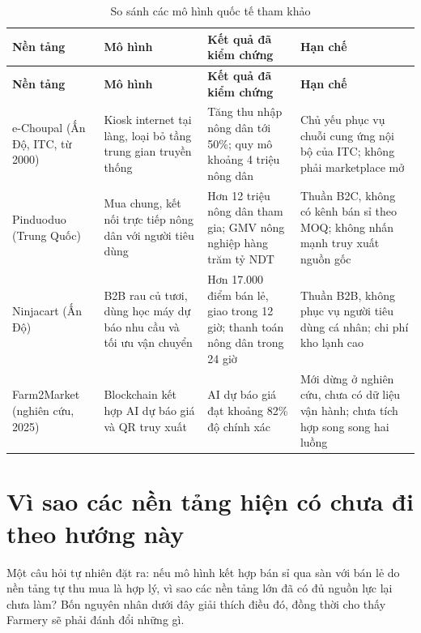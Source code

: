 \begingroup
\tblsetup\tblzebra
\begin{longtable}{L{2.53cm} L{3.13cm} L{4.44cm} L{4.44cm}}
\caption{So sánh các mô hình quốc tế tham khảo}
\label{tab:sosanhquocte} \\
\toprule
{}
\textbf{Nền tảng} & \textbf{Mô hình} & \textbf{Kết quả đã kiểm chứng} & \textbf{Hạn chế} \\
\midrule
\endfirsthead
\toprule
{}
\textbf{Nền tảng} & \textbf{Mô hình} & \textbf{Kết quả đã kiểm chứng} & \textbf{Hạn chế} \\
\midrule
\endhead
\bottomrule
\endfoot
e-Choupal (Ấn Độ, ITC, từ 2000) & Kiosk internet tại làng, loại bỏ tầng trung gian truyền thống & Tăng thu nhập nông dân tới 50\%; quy mô khoảng 4 triệu nông dân \parencite{business_standard_2020_echoupal} & Chủ yếu phục vụ chuỗi cung ứng nội bộ của ITC; không phải marketplace mở \\
Pinduoduo (Trung Quốc) & Mua chung, kết nối trực tiếp nông dân với người tiêu dùng & Hơn 12 triệu nông dân tham gia; GMV nông nghiệp hàng trăm tỷ NDT \parencite{nasdaq_2021_pinduoduo} & Thuần B2C, không có kênh bán sỉ theo MOQ; không nhấn mạnh truy xuất nguồn gốc \\
Ninjacart (Ấn Độ) & B2B rau củ tươi, dùng học máy dự báo nhu cầu và tối ưu vận chuyển & Hơn 17.000 điểm bán lẻ, giao trong 12 giờ; thanh toán nông dân trong 24 giờ \parencite{ninjacart} & Thuần B2B, không phục vụ người tiêu dùng cá nhân; chi phí kho lạnh cao \\
Farm2Market (nghiên cứu, 2025) & Blockchain kết hợp AI dự báo giá và QR truy xuất & AI dự báo giá đạt khoảng 82\% độ chính xác \parencite{farm2market_2025} & Mới dừng ở nghiên cứu, chưa có dữ liệu vận hành; chưa tích hợp song song hai luồng \\
\end{longtable}
\endgroup

\section{Vì sao các nền tảng hiện có chưa đi theo hướng này}
\label{sec:visaochualam}

Một câu hỏi tự nhiên đặt ra: nếu mô hình kết hợp bán sỉ qua sàn với bán lẻ do nền tảng tự thu mua là hợp lý, vì sao các nền tảng lớn đã có đủ nguồn lực lại chưa làm? Bốn nguyên nhân dưới đây giải thích điều đó, đồng thời cho thấy Farmery sẽ phải đánh đổi những gì.

